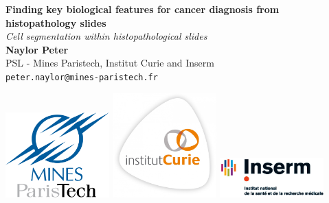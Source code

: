 \documentclass[a0,portrait]{a0poster}
\begin{document}


\begin{minipage}[b]{0.6\linewidth}
\veryHuge \color{NavyBlue} \textbf{Finding key biological features for cancer diagnosis from histopathology slides
} \color{Black}\\ %
\Huge\textit{Cell segmentation within histopathological slides}\\[2cm] %
\huge \textbf{Naylor Peter}\\[0.5cm] %
\huge PSL - Mines Paristech, Institut Curie and Inserm\\[0.4cm] %
\Large \texttt{peter.naylor@mines-paristech.fr} \\
\end{minipage}
%
\begin{minipage}[b]{0.4\linewidth}
\includegraphics[width=0.3\textwidth]{Mines_ParisTech.png} 
\includegraphics[width=0.3\textwidth]{CURIE.jpg}
\includegraphics[width=0.3\textwidth]{INSERM.jpg}
\end{minipage}
\end{document}
